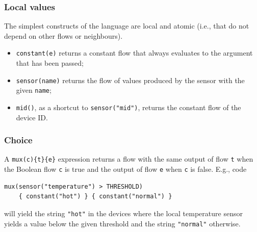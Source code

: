 \subsubsection{Local values}
%
The simplest constructs of the language are local and atomic 
(i.e., that do not depend on other flows or neighbours).
%
\begin{itemize}
    \item \lstinline|constant(e)| returns a constant flow that always evaluates to the argument that has been passed;
    \item \lstinline|sensor(name)| returns the flow of values produced by the sensor with the given \texttt{name};
    \item \lstinline|mid()|, as a shortcut to \lstinline|sensor("mid")|, returns the constant flow of the device ID. %
\end{itemize}


\subsubsection{Choice}
%
A \lstinline|mux(c){t}{e}| expression
 returns a flow with the same output of flow \texttt{t} when the Boolean flow \texttt{c} is true and the output of flow \texttt{e} when \texttt{c} is false.
%
E.g., code 
\begin{lstlisting}
mux(sensor("temperature") > THRESHOLD)
    { constant("hot") } { constant("normal") }
\end{lstlisting}
will yield the string \lstinline|"hot"|
in the devices where the local temperature sensor yields a value below the given threshold
and the string \lstinline|"normal"| otherwise.

%

